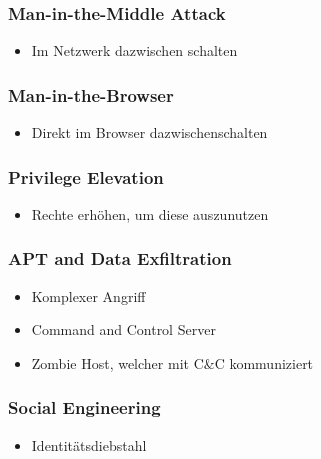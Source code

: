 \subsubsection{Man-in-the-Middle Attack}
\begin{itemize}
    \item Im Netzwerk dazwischen schalten
\end{itemize}


\subsubsection{Man-in-the-Browser}
\begin{itemize}
    \item Direkt im Browser dazwischenschalten
\end{itemize}


\subsubsection{Privilege Elevation}
\begin{itemize}
    \item Rechte erhöhen, um diese auszunutzen
\end{itemize}


\subsubsection{APT and Data Exfiltration}
\begin{itemize}
    \item Komplexer Angriff
    \item Command and Control Server
    \item Zombie Host, welcher mit C\&C kommuniziert
\end{itemize}

\subsubsection{Social Engineering}
\begin{itemize}
    \item Identitätsdiebstahl
\end{itemize}

\vfill
$ $
